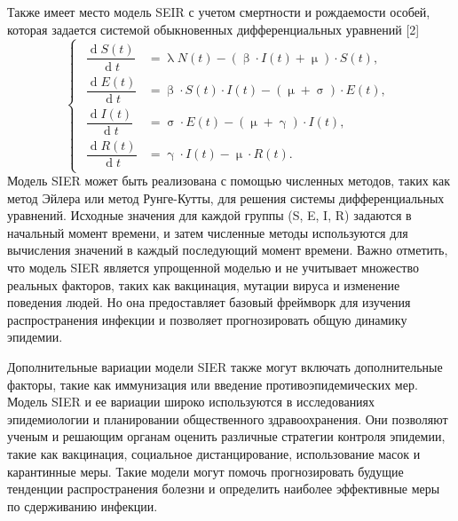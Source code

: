 \documentclass[a4paper, 12pt]{extarticle}
\numberwithin{equation}{section}
\renewcommand{\beta}{\upbeta}
\renewcommand{\gamma}{\upgamma}
\renewcommand{\sigma}{\upsigma}
\renewcommand{\lambda}{\uplambda}
\renewcommand{\mu}{\upmu}
\renewcommand{\d}{\operatorname{d}}
\begin{document}
	Также имеет место модель SEIR с учетом смертности и рождаемости особей, которая задается системой обыкновенных дифференциальных уравнений [2]
	\begin{equation}
		\left\{ 
		\begin{gathered} 
			\begin{aligned}
				\dfrac {\d S(t)}{\d t} &= \lambda N(t) - (\beta \cdot I(t) +\mu)\cdot S(t),\\
				\dfrac {\d E(t)}{\d t} &= \beta \cdot S(t)\cdot I(t) - (\mu + \sigma)\cdot E(t),\\
				\dfrac{\d I(t)}{\d t} &=\sigma \cdot E(t) - (\mu + \gamma)\cdot I(t),\\
				\dfrac{\d R(t)}{\d t} &= \gamma\cdot I(t) - \mu \cdot R(t). 
			\end{aligned}
		\end{gathered} 
		\right.
	\end{equation}
	Модель SIER может быть реализована с помощью численных методов, таких как метод Эйлера или метод Рунге-Кутты, для решения системы дифференциальных уравнений. Исходные значения для каждой группы (S, E, I, R) задаются в начальный момент времени, и затем численные методы используются для вычисления значений в каждый последующий момент времени.
	Важно отметить, что модель SIER является упрощенной моделью и не учитывает множество реальных факторов, таких как вакцинация, мутации вируса и изменение поведения людей. Но она предоставляет базовый фреймворк для изучения распространения инфекции и позволяет прогнозировать общую динамику эпидемии.
	
	Дополнительные вариации модели SIER также могут включать дополнительные факторы, такие как иммунизация или введение противоэпидемических мер. Модель SIER и ее вариации широко используются в исследованиях эпидемиологии и планировании общественного здравоохранения. Они позволяют ученым и решающим органам оценить различные стратегии контроля эпидемии, такие как вакцинация, социальное дистанцирование, использование масок и карантинные меры. Такие модели могут помочь прогнозировать будущие тенденции распространения болезни и определить наиболее эффективные меры по сдерживанию инфекции.
	
\end{document}
